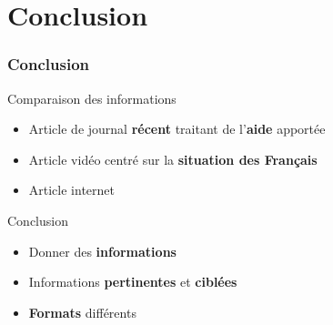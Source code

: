 \section{Conclusion}
\begin{frame}
\frametitle{Conclusion}
  \begin{block}{Comparaison des informations}
    \begin{itemize}
      \item{Article de journal \textbf{récent} traitant de l'\textbf{aide} apportée}
      \item{Article vidéo centré sur la \textbf{situation des Français}}
      \item{Article internet }
    \end{itemize} 
  \end{block} \pause
  
  \begin{block}{Conclusion}
    \begin{itemize}
      \item{Donner des \textbf{informations}}
      \item{Informations \textbf{pertinentes} et \textbf{ciblées}}
      \item{\textbf{Formats} différents}
    \end{itemize}
  \end{block}
\end{frame}
